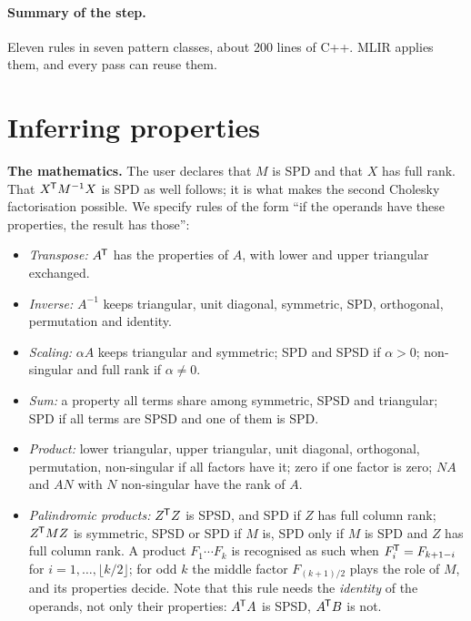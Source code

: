 \documentclass[11pt,a4paper]{article}
\newcommand{\T}{^{\mkern-1.5mu\mathsf{T}}}
\newcommand{\inv}{^{-1}}
\newenvironment{maths}{\par\medskip\noindent\begin{minipage}{\linewidth}%
  \setlength{\parskip}{\medskipamount}\sffamily\small
  \textbf{The mathematics.}\enspace}{\end{minipage}\par\medskip}
\begin{document}
\paragraph{Summary of the step.}
Eleven rules in seven pattern classes, about 200 lines of C++. MLIR applies
them, and every pass can reuse them.

\section{Inferring properties}
\label{sec:infer}

\begin{maths}
The user declares that \(M\) is SPD and that \(X\) has full rank. That
\(X\T M\inv X\) is SPD as well follows; it is what makes the second
Cholesky factorisation possible. We specify rules of the form ``if the
operands have these properties, the result has those'':
\begin{itemize}
\item \emph{Transpose:} \(A\T\) has the properties of \(A\), with lower and
  upper triangular exchanged.
\item \emph{Inverse:} \(A\inv\) keeps triangular, unit diagonal,
  symmetric, SPD, orthogonal, permutation and identity.
\item \emph{Scaling:} \(\alpha A\) keeps triangular and symmetric; SPD and
  SPSD if \(\alpha>0\); non-singular and full rank if \(\alpha\ne0\).
\item \emph{Sum:} a property all terms share among symmetric, SPSD and
  triangular; SPD if all terms are SPSD and one of them is SPD.
\item \emph{Product:} lower triangular, upper triangular, unit diagonal,
  orthogonal, permutation, non-singular if all factors have it; zero if one
  factor is zero; \(NA\) and \(AN\) with \(N\) non-singular have the rank
  of \(A\).
\item \emph{Palindromic products:} \(Z\T Z\) is SPSD, and SPD if \(Z\) has
  full column rank; \(Z\T MZ\) is symmetric, SPSD or SPD if \(M\) is, SPD
  only if \(M\) is SPD and \(Z\) has full column rank. A product
  \(F_1\cdots F_k\) is recognised as such when \(F_i\T=F_{k+1-i}\) for
  \(i=1,\dots,\lfloor k/2\rfloor\); for odd \(k\) the middle factor
  \(F_{(k+1)/2}\) plays the role of \(M\), and its properties decide. Note
  that this rule needs the \emph{identity} of the operands, not only their
  properties: \(A\T A\) is SPSD, \(A\T B\) is not.
\end{itemize}
\end{maths}
\end{document}
